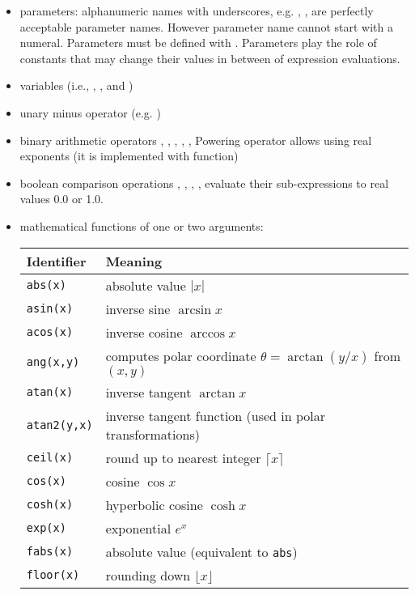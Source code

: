 \begin{itemize}
\item parameters: alphanumeric names with underscores, e.g. ,
,  are perfectly acceptable parameter
names. However parameter name cannot start with a numeral. Parameters must be
defined with . Parameters play the role of
constants that may change their values in between of expression evaluations.

\item variables (i.e., , ,  and )
\item unary minus operator (e.g. )
\item binary arithmetic operators \inlsh{+}, \inlsh{-}, \inlsh{*}, \inlsh{/}, 
   \inlsh{\^{}}, \inlsh{\%}
   Powering operator allows using real exponents (it is implemented with
    function)
\item boolean comparison operations \inlsh{<}, \inlsh{<=}, \inlsh{>}, \inlsh{>=}, 
\inlsh{==} evaluate their sub-expressions to real values 0.0 or 1.0.
\item mathematical functions of one or two arguments:
\begin{center}
\begin{tabular}{ll}
  \toprule
  \textbf{Identifier} & \textbf{Meaning} \\
  \midrule
  \texttt{abs(x)}     & absolute value $|x|$ \\
  \texttt{asin(x)}    & inverse sine $\arcsin x$ \\
  \texttt{acos(x)}    & inverse cosine $\arccos x$ \\
  \texttt{ang(x,y)}   & computes polar coordinate $\theta=\arctan(y/x)$ from $(x,y)$\\
  \texttt{atan(x)}    & inverse tangent $\arctan x$ \\
  \texttt{atan2(y,x)} & inverse tangent function (used in polar transformations) \\
  \texttt{ceil(x)}    & round up to nearest integer $\lceil x\rceil$ \\
  \texttt{cos(x)}     & cosine $\cos x$ \\
  \texttt{cosh(x)}    & hyperbolic cosine $\cosh x$ \\
  \texttt{exp(x)}     & exponential $e^x$ \\
  \texttt{fabs(x)}    & absolute value (equivalent to \texttt{abs}) \\
  \texttt{floor(x)}   & rounding down $\lfloor x\rfloor$ \\

\end{tabular}
\end{center}
\end{itemize}
